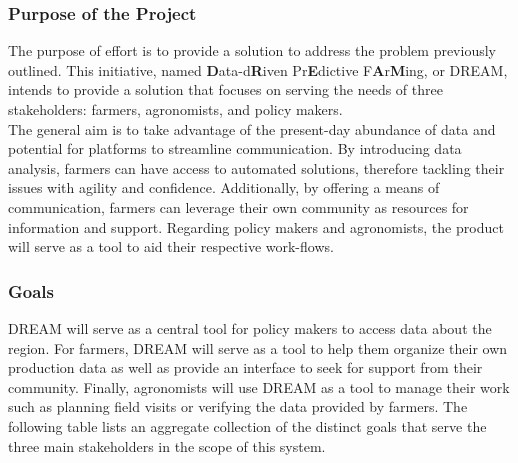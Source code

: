 \begin{flushleft}
\subsubsection{Purpose of the Project}
The purpose of effort is to provide a solution to address the problem previously outlined. 
This initiative, named {\bf D}ata-d{\bf R}iven Pr{\bf E}dictive F{\bf A}r{\bf M}ing, or DREAM, intends to provide a solution that focuses on serving the needs of three stakeholders: farmers, agronomists, and policy makers. 
\smallskip \\
The general aim is to take advantage of the present-day abundance of data and potential for platforms to streamline communication. By introducing data analysis, farmers can have access to automated solutions, therefore tackling their issues with agility and confidence. Additionally, by offering a means of communication, farmers can leverage their own community as resources for information and support. Regarding policy makers and agronomists, the product will serve as a tool to aid their respective work-flows. 
 
\end{flushleft}

\subsubsection{Goals}

DREAM will serve as a central tool for policy makers to access data about the region. For farmers, DREAM will serve as a tool to help them organize their own production data as well as provide an interface to seek for support from their community. Finally, agronomists will use DREAM as a tool to manage their work such as planning field visits or verifying the data provided by farmers. The following table lists an aggregate collection of the distinct goals that serve the three main stakeholders in the scope of this system.

